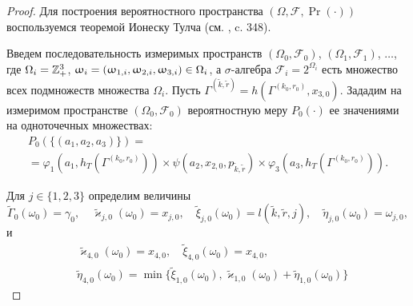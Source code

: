 \begin{proof}
Для построения вероятностного пространства $(\Omega,   {\mathcal F},   \Pr(\cdot))$ воспользуемся теоремой Ионеску Тулча (см. \cite{Shiryaev},   c. 348). 

Введем последовательность измеримых пространств $(\Omega_0,   {\mathcal F}_0)$,   $(\Omega_1,   {\mathcal F}_1)$,   $\ldots$,   где $\Omega_i\hm=\mathbb{Z}_+^3$,   $\omega_i=(\omega_{1,  i},  \omega_{2,  i},  \omega_{3,  i}) \hm\in \Omega_i$,   а $\sigma$-алгебра ${\mathcal F}_i=2^{\Omega_i}$  есть множество всех подмножеств множества $\Omega_i$. 
Пусть $\Gamma^{(\tilde{k},  \tilde{r})}=h(\Gamma^{(k_0,  r_0)},  x_{3,  0})$.
Зададим на измеримом пространстве $(\Omega_0,   {\mathcal F}_0)$ вероятностную меру $P_0(\cdot)$ ее значениями на одноточечных множествах:
\begin{multline}
P_0(\{(a_1,  a_2,  a_3)\})=\\=\varphi_1(a_1,  h_T(\Gamma^{(k_0,  r_0)})) \times \psi(a_2,  x_{2,  0},   p_{\tilde{k},  \tilde{r}}) \times \varphi_3(a_3,  h_T(\Gamma^{(k_0,  r_0)})).
\label{probabilitiesOne}
\end{multline}

Для $j\in \{1,  2,  3\}$ определим величины
\begin{equation}
\tilde{\Gamma}_0(\omega_0)=\gamma_0,  \quad \tilde{\varkappa}_{j,  0}(\omega_0)=x_{j,  0},   \quad \tilde{\xi}_{j,  0}(\omega_0)=l(\tilde{k},  \tilde{r},  j),   \quad \tilde{\eta}_{j,  0}(\omega_0)=\omega_{j,  0},  
\label{startRekOne}
\end{equation}
и
\begin{equation}
\begin{aligned}
 &\tilde{\varkappa}_{4,  0}(\omega_0)=x_{4,  0},   \quad \tilde{\xi}_{4,  0}(\omega_0)=x_{4,  0},  \\
&\tilde{\eta}_{4,  0}(\omega_0)=\min\{\tilde{\xi}_{1,  0}(\omega_0),   \tilde{\varkappa}_{1,  0}(\omega_0)+\tilde{\eta}_{1,  0}(\omega_0)\}
\end{aligned}
\label{startRekTwo}
\end{equation}


\end{proof}
